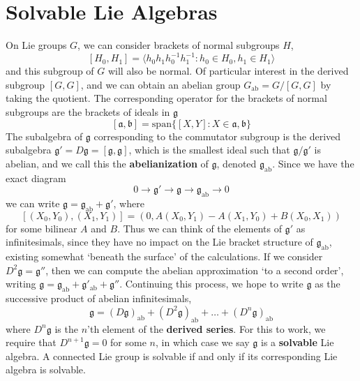 \section{Solvable Lie Algebras}

On Lie groups $G$, we can consider brackets of normal subgroups $H$,
%
\[ [H_0,H_1] = \langle h_0h_1h_0^{-1}h_1^{-1} : h_0 \in H_0, h_1 \in H_1 \rangle \]
%
and this subgroup of $G$ will also be normal. Of particular interest in the derived subgroup $[G,G]$, and we can obtain an abelian group $G_{\text{ab}} = G/[G,G]$ by taking the quotient. The corresponding operator for the brackets of normal subgroups are the brackets of ideals in $\mathfrak{g}$
%
\[ [\mathfrak{a}, \mathfrak{b}] = \text{span} \{ [X,Y] : X \in \mathfrak{a}, \mathfrak{b} \} \]
%
The subalgebra of $\mathfrak{g}$ corresponding to the commutator subgroup is the derived subalgebra $\mathfrak{g}' = D\mathfrak{g} = [\mathfrak{g}, \mathfrak{g}]$, which is the smallest ideal such that $\mathfrak{g}/\mathfrak{g}'$ is abelian, and we call this the {\bf abelianization} of $\mathfrak{g}$, denoted $\mathfrak{g}_{\text{ab}}$. Since we have the exact diagram
%
\[ 0 \to \mathfrak{g}' \to \mathfrak{g} \to \mathfrak{g}_{\text{ab}} \to 0 \]
%
we can write $\mathfrak{g} = \mathfrak{g}_{\text{ab}} + \mathfrak{g}'$, where
%
\[ [(X_0,Y_0),(X_1,Y_1)] = (0, A(X_0,Y_1) - A(X_1,Y_0) + B(X_0,X_1)) \]
%
for some bilinear $A$ and $B$. Thus we can think of the elements of $\mathfrak{g}'$ as infinitesimals, since they have no impact on the Lie bracket structure of $\mathfrak{g}_{\text{ab}}$, existing somewhat `beneath the surface' of the calculations. If we consider $D^2 \mathfrak{g} = \mathfrak{g}''$, then we can compute the abelian approximation `to a second order', writing $\mathfrak{g} = \mathfrak{g}_{\text{ab}} + \mathfrak{g}'_{\text{ab}} + \mathfrak{g}''$. Continuing this process, we hope to write $\mathfrak{g}$ as the successive product of abelian infinitesimals,
%
\[ \mathfrak{g} = (D\mathfrak{g})_{\text{ab}} + (D^2 \mathfrak{g})_{\text{ab}} + \dots + (D^n \mathfrak{g})_{\text{ab}} \]
%
where $D^n \mathfrak{g}$ is the $n$'th element of the {\bf derived series}. For this to work, we require that $D^{n+1} \mathfrak{g} = 0$ for some $n$, in which case we say $\mathfrak{g}$ is a {\bf solvable} Lie algebra. A connected Lie group is solvable if and only if its corresponding Lie algebra is solvable.

